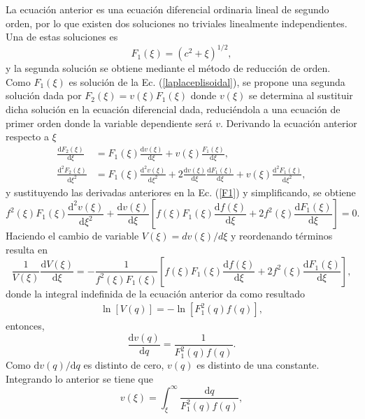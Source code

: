 La ecuación anterior es una ecuación diferencial ordinaria lineal de segundo orden, por lo que existen dos soluciones no triviales linealmente independientes. Una de estas soluciones es
\begin{equation}
    F_1(\xi)=(c^2+\xi)^{1/2},
    \label{F1}
\end{equation}
y la segunda solución se obtiene mediante el método de reducción de orden. Como $F_1(\xi)$ es solución de la Ec. (\ref{laplaceplisoidal}), se propone una segunda solución dada por $F_2(\xi)=v(\xi)F_1(\xi)$ donde $v(\xi)$ se determina al sustituir dicha solución en la ecuación diferencial dada, reduciéndola a una ecuación de primer orden donde la variable dependiente será $v$. Derivando la ecuación anterior respecto a $\xi$
\begin{align*}
    \frac{\text{d}F_2(\xi)}{\text{d}\xi}&=F_1(\xi)\frac{\text{d}v(\xi)}{\text{d}\xi}+v(\xi)\frac{F_1(\xi)}{\text{d}\xi},\\
    \frac{\text{d}^2F_2(\xi)}{\text{d}\xi^2}&=F_1(\xi)\frac{\text{d}^2v(\xi)}{\text{d}\xi^2}+2\frac{\text{d}v(\xi)}{\text{d}\xi}\frac{\text{d}F_1(\xi)}{\text{d}\xi}+v(\xi)\frac{\text{d}^2F_1(\xi)}{\text{d}\xi^2},
\end{align*}
y sustituyendo las derivadas anteriores en la Ec. (\ref{F1}) y simplificando, se obtiene
\begin{equation*}
    f^2(\xi)F_1(\xi)\frac{\text{d}^2v(\xi)}{\text{d}\xi^2}+\frac{\text{d}v(\xi)}{\text{d}\xi}\left[f(\xi)F_1(\xi)\frac{\text{d}f(\xi)}{\text{d}\xi}+2f^2(\xi)\frac{\text{d}F_1(\xi)}{\text{d}\xi}\right]=0.
\end{equation*}
Haciendo el cambio de variable $V(\xi)=dv(\xi)/d\xi$ y reordenando términos resulta en
\begin{equation*}
    \frac{1}{V(\xi)}\frac{\text{d}V(\xi)}{\text{d}\xi}=-\frac{1}{f^2(\xi)F_1(\xi)}\left[f(\xi)F_1(\xi)\frac{\text{d}f(\xi)}{\text{d}\xi}+2f^2(\xi)\frac{\text{d}F_1(\xi)}{\text{d}\xi}\right],
\end{equation*}
donde la integral indefinida de la ecuación anterior da como resultado
\begin{align*}
    \ln[V(q)]=-\ln[F_1^2(q)f(q)],
\end{align*}
entonces,
\begin{equation*}
    \frac{\text{d}v(q)}{\text{d}q}=\frac{1}{F_1^2(q)f(q)}.
\end{equation*}
Como $\text{d}v(q)/\text{d}q$ es distinto de cero,  $v(q)$ es distinto de una constante. Integrando lo anterior se tiene que
\begin{equation*}
    v(\xi)=\int_{\xi}^{\infty}\frac{\text{d}q}{F_1^2(q)f(q)},
\end{equation*}
